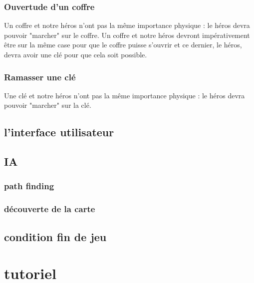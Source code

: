 \documentclass[a4paper 12pts]{article}
\begin{document}

\subsubsection {Ouvertude d'un coffre}
Un coffre et notre héros n'ont pas la même importance physique : le héros devra pouvoir "marcher" sur le coffre.
Un coffre et notre héros devront impérativement être sur la même case pour que le coffre puisse s'ouvrir et ce dernier, 
le héros, devra avoir une clé pour que cela soit possible.


\subsubsection {Ramasser une clé}
Une clé et notre héros n'ont pas la même importance physique : le héros devra pouvoir "marcher" sur la clé.

 
\subsection{l'interface utilisateur}

\subsection{IA}

\subsubsection{path finding}

\subsubsection{découverte de la carte}

\subsection{condition fin de jeu}





\section{tutoriel}
\end{document}
